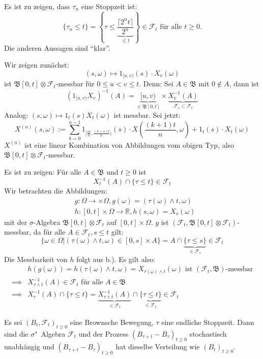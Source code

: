 \documentclass[a4paper,twoside,DIV15,BCOR12mm]{scrbook}
\newcommand{\cF}{\mathcal F}
\newcommand{\borel}{{\mathfrak B}}
\begin{document}
\begin{beweis}
  \begin{enuma}
  \item Es ist zu zeigen, dass $\tau_n$ eine Stoppzeit ist:
\[
\{\tau_n\leq t\}=\left\{\tau\leq\underbrace{\frac{\lceil 2^nt\rceil}{2^n}}_{\leq t}\right\}\in\cF_t\text{ für alle }t\geq0.
  \]
Die anderen Aussagen sind ``klar''.
\item Wir zeigen zunächst:
\[
(s,\omega)\mapsto1_{[u,v)}(s)\cdot X_v(\omega)
\]
ist $\borel[0,t]\otimes\cF_t$-messbar für $0\leq u<v\leq t$. Denn: Sei $A\in\borel$ mit $0\notin A$, dann ist
\[
(1_{[u,v)}X_v)^{-1}(A)=\underbrace{[u,v)}_{\in\borel[0,t]}\times\underbrace{X_v^{-1}(A)}_{\cF_v\subset\cF_t}
\]
Analog: $(s,\omega)\mapsto1_{t}(s)X_t(\omega)$ ist messbar.
Sei jetzt: 
\[
X^{(n)}(s,\omega):=\sum_{k=0}^{n-1}1_{[\frac{kt}{n},\frac{(k+1)t}{n})}(s)\cdot X(\frac{(k+1)t}{n},\omega)+1_{t}(s)\cdot X_t(\omega)
\]
$X^{(n)}$ ist eine linear Kombination von Abbildungen vom obigen Typ, also $\borel[0,t]\otimes\cF_t$-messbar.
\item Es ist zu zeigen: Für alle $A\in\borel$ und $t\geq0$ ist
\[
X_t^{-1}(A)\cap\{\tau\leq t\}\in\cF_t
\]
Wir betrachten die Abbildungen:
\begin{align*}
  & g:\Omega\longrightarrow\times\Omega ,g(\omega)=(\tau(\omega)\wedge t,\omega) \\
  & h:[0,t]\times\Omega\longrightarrow\mathbb R ,h(s,\omega)=X_s(\omega)
\end{align*}
mit der $\sigma$-Algebra $\borel[0,t]\otimes\cF_t$ auf $[0,t]\times\Omega$. $g$ ist $(\cF_t,\borel[0,t]\otimes\cF_t)$-messbar, da für alle $A\in\cF_t, s\leq t$ gilt:
\[
\{\omega\in\Omega\vert(\tau(\omega)\wedge t,\omega)\in[0,s]\times A\}=A\cap\underbrace{\{\tau\leq s\}}_{\in\cF_s}\in\cF_t
\]
Die Messbarkeit von $h$ folgt aus b.). Es gilt also:
\begin{align*}
  & h(g(\omega))=h(\tau(\omega)\wedge t,\omega)=X_{\tau(\omega)\wedge t}(\omega)\text{ ist $(\cF_t,\borel)$-messbar} \\
\implies & X_{\tau\wedge t}^{-1}(A)\in\cF_t\text{ für alle }A\in\borel \\
\implies & X_\tau^{-1}(A)\cap\{\tau\leq t\}=\underbrace{X_{\tau\wedge t}^{-1}(A)}_{\in\cF_t}\cap\underbrace{\{\tau\leq t\}}_{\in\cF_t}\in\cF_t
\end{align*}
  \end{enuma}
\end{beweis}
\begin{satz}
  \label{satz:13.2}
Es sei $(B_t,\cF_t)_{t\geq0}$ eine Brownsche Bewegung, $\tau$ eine endliche Stoppzeit. Dann sind die $\sigma$"~Algebra $\cF_t$ und der Prozess $(B_{\tau+t}-B_{\tau})_{t\geq0}$ stochastisch unabhängig und $(B_{\tau+t}-B_{\tau})_{t\geq0}$ hat dieselbe Verteilung wie $(B_t)_{t\geq0}$.
\end{satz}
\end{document}

